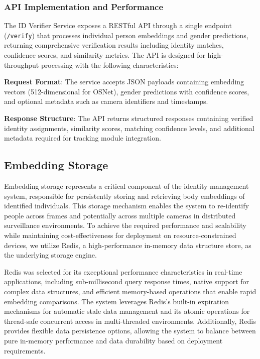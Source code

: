 \subsubsection{API Implementation and Performance}

The ID Verifier Service exposes a RESTful API through a single endpoint (\texttt{/verify}) that processes individual person embeddings and gender predictions, returning comprehensive verification results including identity matches, confidence scores, and similarity metrics. The API is designed for high-throughput processing with the following characteristics:

\textbf{Request Format}: The service accepts JSON payloads containing embedding vectors (512-dimensional for OSNet), gender predictions with confidence scores, and optional metadata such as camera identifiers and timestamps.

\textbf{Response Structure}: The API returns structured responses containing verified identity assignments, similarity scores, matching confidence levels, and additional metadata required for tracking module integration.

\subsection{Embedding Storage}

Embedding storage represents a critical component of the identity management system, responsible for persistently storing and retrieving body embeddings of identified individuals. This storage mechanism enables the system to re-identify people across frames and potentially across multiple cameras in distributed surveillance environments. To achieve the required performance and scalability while maintaining cost-effectiveness for deployment on resource-constrained devices, we utilize Redis, a high-performance in-memory data structure store, as the underlying storage engine.

Redis was selected for its exceptional performance characteristics in real-time applications, including sub-millisecond query response times, native support for complex data structures, and efficient memory-based operations that enable rapid embedding comparisons. The system leverages Redis's built-in expiration mechanisms for automatic stale data management and its atomic operations for thread-safe concurrent access in multi-threaded environments. Additionally, Redis provides flexible data persistence options, allowing the system to balance between pure in-memory performance and data durability based on deployment requirements.

